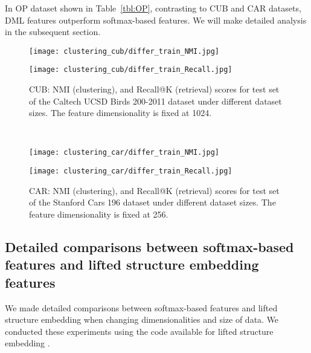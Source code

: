 \documentclass[9pt,technote,compsoc]{./sty/IEEEtran}
\newcommand{\Tref}[1]{Table~\ref{#1}}
\begin{document}
In OP dataset shown in \Tref{tbl:OP}, contrasting to CUB and CAR datasets, DML features outperform softmax-based features. We will make detailed analysis in the subsequent section. 


\begin{figure*}[t!]
	\begin{minipage}{0.90\linewidth}
\hfill
		\begin{minipage}{0.45\hsize}
			\centering
			\texttt{[image: clustering\_cub/differ\_train\_NMI.jpg]}
		\end{minipage}
		\hfill
		\begin{minipage}{0.45\hsize}
			\centering
			\texttt{[image: clustering\_cub/differ\_train\_Recall.jpg]}
		\end{minipage}	
		\caption{CUB: NMI (clustering), and Recall@K (retrieval) scores for test set of the Caltech UCSD Birds 200-2011 dataset under different dataset sizes. The feature dimensionality is fixed at 1024.}
		\label{fig:CUB_scale}
	\end{minipage}
	\\
	\begin{minipage}{0.90\linewidth}
\hfill
		\begin{minipage}{0.45\hsize}
			\centering
			\texttt{[image: clustering\_car/differ\_train\_NMI.jpg]}
		\end{minipage}
		\hfill
		\begin{minipage}{0.45\hsize}
			\centering
			\texttt{[image: clustering\_car/differ\_train\_Recall.jpg]}
		\end{minipage}	
		\caption{CAR: NMI (clustering), and Recall@K (retrieval) scores for test set of the Stanford Cars 196 dataset under different dataset sizes. The feature dimensionality is fixed at 256.}
		\label{fig:CAR_scale}
	\end{minipage}
\end{figure*}


\subsection{Detailed comparisons between softmax-based features and lifted structure embedding features}

We made detailed comparisons between softmax-based features and lifted structure embedding \cite{song2016deep} when changing dimensionalities and size of data. We conducted these experiments using the code available for lifted structure embedding \cite{song2016deep}.
\end{document}
